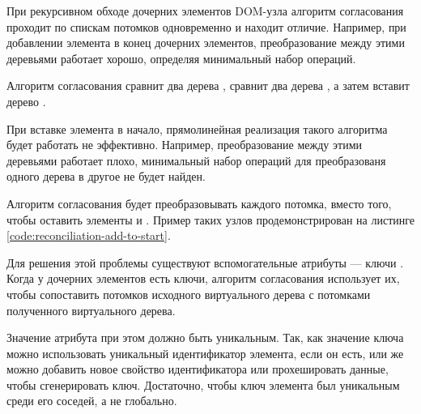 При рекурсивном обходе дочерних элементов DOM-узла алгоритм согласования проходит по спискам потомков одновременно и находит отличие.
Например, при добавлении элемента в конец дочерних элементов, преобразование между этими деревьями работает хорошо, определяя минимальный набор операций.


Алгоритм согласования сравнит два дерева , сравнит два дерева , а затем вставит дерево . 

При вставке элемента в начало, прямолинейная реализация такого алгоритма будет работать не эффективно. Например, преобразование между этими деревьями работает плохо, минимальный набор операций для преобразованя одного дерева в другое не будет найден.

Алгоритм согласования будет преобразовывать каждого потомка, вместо того, чтобы оставить элементы  и \linebreak
{}. Пример таких узлов продемонстрирован на листинге \ref{code:reconciliation-add-to-start}.

\clearpage


Для решения этой проблемы существуют вспомогательные атрибуты  --- ключи \cite{keys}. Когда у дочерних элементов есть ключи, алгоритм согласования использует их, чтобы сопоставить потомков исходного виртуального дерева с потомками полученного виртуального дерева.

Значение атрибута  при этом должно быть уникальным.
Так, как значение ключа  можно использовать уникальный идентификатор элемента, если он есть, или же можно добавить новое свойство идентификатора или прохешировать данные, чтобы сгенерировать ключ. 
Достаточно, чтобы ключ элемента был уникальным среди его соседей, а не глобально.

